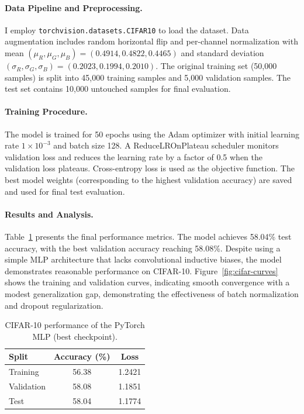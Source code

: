 \documentclass[11pt,a4paper]{article}
\begin{document}
\paragraph{Data Pipeline and Preprocessing.} I employ \texttt{torchvision.datasets.CIFAR10} to load the dataset. Data augmentation includes random horizontal flip and per-channel normalization with mean $(\mu_R, \mu_G, \mu_B) = (0.4914, 0.4822, 0.4465)$ and standard deviation $(\sigma_R, \sigma_G, \sigma_B) = (0.2023, 0.1994, 0.2010)$. The original training set (50,000 samples) is split into 45,000 training samples and 5,000 validation samples. The test set contains 10,000 untouched samples for final evaluation.

\paragraph{Training Procedure.} The model is trained for 50 epochs using the Adam optimizer with initial learning rate $1 \times 10^{-3}$ and batch size 128. A ReduceLROnPlateau scheduler monitors validation loss and reduces the learning rate by a factor of 0.5 when the validation loss plateaus. Cross-entropy loss is used as the objective function. The best model weights (corresponding to the highest validation accuracy) are saved and used for final test evaluation.

\paragraph{Results and Analysis.} Table~\ref{tab:cifar-results} presents the final performance metrics. The model achieves 58.04\% test accuracy, with the best validation accuracy reaching 58.08\%. Despite using a simple MLP architecture that lacks convolutional inductive biases, the model demonstrates reasonable performance on CIFAR-10. Figure~\ref{fig:cifar-curves} shows the training and validation curves, indicating smooth convergence with a modest generalization gap, demonstrating the effectiveness of batch normalization and dropout regularization.

\begin{table}[h]
    \centering
    \caption{CIFAR-10 performance of the PyTorch MLP (best checkpoint).}
    \label{tab:cifar-results}
    \begin{tabular}{@{}lcc@{}}
        \toprule
        Split & Accuracy (\%) & Loss \\
        \midrule
        Training & 56.38 & 1.2421 \\
        Validation & 58.08 & 1.1851 \\
        Test & 58.04 & 1.1774 \\
        \bottomrule
    \end{tabular}
\end{table}
\end{document}
